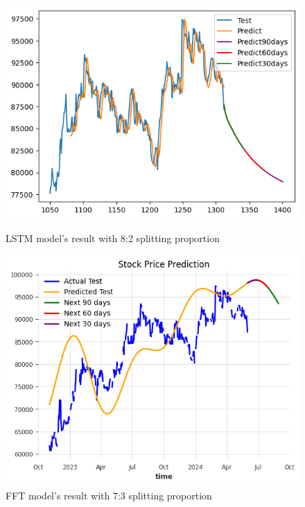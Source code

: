 \documentclass{ieeeojies}
\begin{document}
\begin{figure}[H]
    \centering
    \begin{minipage}{0.45\linewidth}
        \centering
        \includegraphics[width=\linewidth]{bibliography/diagram/LSTM-VCB.png}
        \caption{LSTM model’s result with 8:2 splitting proportion}
        \label{fig:LSTM-VCB}
    \end{minipage}
    \hfill
    \begin{minipage}{0.45\linewidth}
        \centering
        \includegraphics[width=\linewidth]{bibliography/diagram/FFT-VCB.png}
        \caption{FFT model’s result with 7:3 splitting proportion}
        \label{fig:FFT-VCB}
    \end{minipage}
\end{figure}
\end{document}
